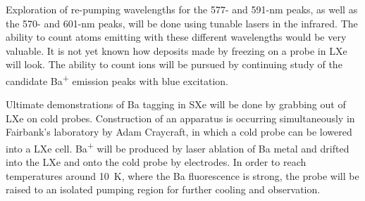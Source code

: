 Exploration of re-pumping wavelengths for the 577- and 591-nm peaks, as well as the 570- and 601-nm peaks, will be done using tunable lasers in the infrared.  The ability to count atoms emitting with these different wavelengths would be very valuable.  It is not yet known how deposits made by freezing on a probe in LXe will look.  The ability to count ions will be pursued by continuing study of the candidate Ba\textsuperscript{+} emission peaks with blue excitation.

Ultimate demonstrations of Ba tagging in SXe will be done by grabbing out of LXe on cold probes.  Construction of an apparatus is occurring simultaneously in Fairbank's laboratory by Adam Craycraft, in which a cold probe can be lowered into a LXe cell.  Ba\textsuperscript{+} will be produced by laser ablation of Ba metal and drifted into the LXe and onto the cold probe by electrodes.  In order to reach temperatures around 10~K, where the Ba fluorescence is strong, the probe will be raised to an isolated pumping region for further cooling and observation.

